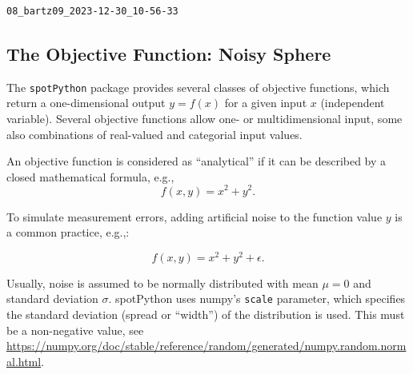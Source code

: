 \documentclass[
  letterpaper,
  DIV=11,
  numbers=noendperiod]{scrreprt}
\begin{document}
\begin{verbatim}
08_bartz09_2023-12-30_10-56-33
\end{verbatim}

\hypertarget{the-objective-function-noisy-sphere}{%
\subsection{The Objective Function: Noisy
Sphere}\label{the-objective-function-noisy-sphere}}

The \texttt{spotPython} package provides several classes of objective
functions, which return a one-dimensional output \(y=f(x)\) for a given
input \(x\) (independent variable). Several objective functions allow
one- or multidimensional input, some also combinations of real-valued
and categorial input values.

An objective function is considered as ``analytical'' if it can be
described by a closed mathematical formula, e.g., \[
f(x, y) = x^2 + y^2.
\]

To simulate measurement errors, adding artificial noise to the function
value \(y\) is a common practice, e.g.,:

\[
f(x, y) = x^2 + y^2 + \epsilon.
\]

Usually, noise is assumed to be normally distributed with mean \(\mu=0\)
and standard deviation \(\sigma\). spotPython uses numpy's
\texttt{scale} parameter, which specifies the standard deviation (spread
or ``width'') of the distribution is used. This must be a non-negative
value, see
\url{https://numpy.org/doc/stable/reference/random/generated/numpy.random.normal.html}.
\end{document}
